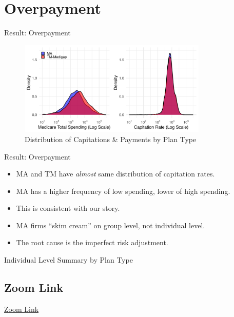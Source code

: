 \section{Overpayment}
\begin{frame}[label=overpayment_distribution]{Result: Overpayment}
    \begin{figure}
        \centering
        \includegraphics[width=0.8\textwidth]{figures/images/capitation_spending_distribution_grouped.png}
        \caption{Distribution of Capitations \& Payments by Plan Type}
    \end{figure}
    \hyperlink{explain_overpayment}{}
\end{frame}

\begin{frame}{Result: Overpayment}

    \begin{itemize}
        \item MA and TM have \textit{almost} same distribution of capitation rates.
        \item MA has a higher frequency of low spending, lower of high spending.
        \item This is consistent with our story.
        \item MA firms ``skim cream'' on group level, not individual level.
        \item The root cause is the imperfect risk adjustment.
    \end{itemize}
\end{frame}

\begin{frame}{Individual Level Summary by Plan Type}
    \begin{figure}
        \centering
        
    \end{figure}
    \hyperlink{explain_overpayment}{}
\end{frame}


\subsection*{Zoom Link}
\begin{frame}
    \href{https://stonybrook.zoom.us/j/95094572016?pwd=ejJWMTdNTzVVTFppQjZqM0lzdGFkUT09}{Zoom Link}
\end{frame}
